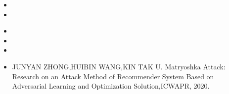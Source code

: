   \begin{itemize}[leftmargin=*]
    \item {}
    \item {}
    
  \end{itemize}
  \begin{itemize}[leftmargin=*]
    \item{}
    \item {}
    \item {}
     \item {JUNYAN ZHONG,HUIBIN WANG,KIN TAK U. Matryoshka Attack: Research on an Attack Method of Recommender System Based on Adversarial Learning and Optimization Solution,ICWAPR, 2020. } 
  \end{itemize}
